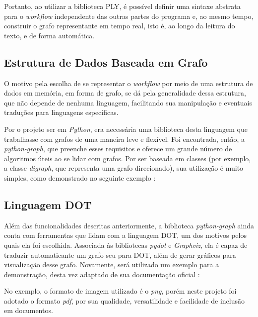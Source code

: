 \documentclass[a4paper,11pt]{article}
\begin{document}
  		Portanto, ao utilizar a biblioteca PLY, é possível definir uma sintaxe abstrata para o \emph{workflow} independente das outras partes do programa e, ao mesmo tempo, construir o grafo representante em tempo real, isto é, ao longo da leitura do texto, e de forma automática. 

  	\subsection{Estrutura de Dados Baseada em Grafo}
  		O motivo pela escolha de se representar o \emph{workflow} por meio de uma estrutura de dados em memória, em forma de grafo, se dá pela generalidade dessa estrutura, que não depende de nenhuma linguagem, facilitando sua manipulação e eventuais traduções para linguagens específicas. 

  		Por o projeto ser em \emph{Python}, era necessária uma biblioteca desta linguagem que trabalhasse com grafos de uma maneira leve e flexível. Foi encontrada, então, a \emph{python-graph}, que preenche esses requisitos e oferece um grande número de algoritmos úteis ao se lidar com grafos. Por ser baseada em classes (por exemplo, a classe \emph{digraph}, que representa uma grafo direcionado), sua utilização é muito simples, como demonstrado no seguinte exemplo \cite{web:pygraphexample}:

  		

  	\newpage
  	\subsection{Linguagem DOT}
  		Além das funcionalidades descritas anteriormente, a biblioteca \emph{python-graph} ainda conta com ferramentas que lidam com a linguagem DOT, um dos motivos pelos quais ela foi escolhida. Associada às bibliotecas \emph{pydot} e \emph{Graphviz}, ela é capaz de traduzir automaticante um grafo seu para DOT, além de gerar gráficos para visualização desse grafo. Novamente, será utilizado um exemplo para a demonstração, desta vez adaptado de sua documentação oficial \cite{web:pygraphexample2}:

  		

  		No exemplo, o formato de imagem utilizado é o \emph{png}, porém neste projeto foi adotado o formato \emph{pdf}, por sua qualidade, versatilidade e facilidade de inclusão em documentos.
\end{document}
